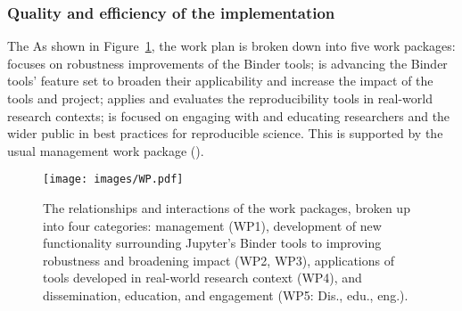 

\subsubsection{Quality and efficiency of the implementation}\label{sec:workplan-structure}

\ifgrantagreement The \else As shown in
Figure~\ref{fig:workpackages}, the \fi work plan is broken down into five work
packages:  focuses on robustness improvements of the
Binder tools;  is advancing the Binder tools' feature set to
broaden their applicability and increase the impact of the tools and project;  applies and
evaluates the reproducibility tools in real-world research contexts;
 is focused on engaging with and educating researchers and the
wider public in best practices for reproducible science. This is supported by
the usual management work package ().

\begin{figure}[htb]
  \centering
  \texttt{[image: images/WP.pdf]}
  \caption{
    \label{fig:workpackages}
    The relationships and interactions of the work packages,
    broken up into four categories: management (WP1),
    development of new functionality surrounding Jupyter's Binder tools to improving robustness
    and broadening impact (WP2, WP3),
    applications of tools developed in real-world research context (WP4),
    and dissemination, education, and engagement (WP5: Dis., edu., eng.).
  }
\end{figure}


